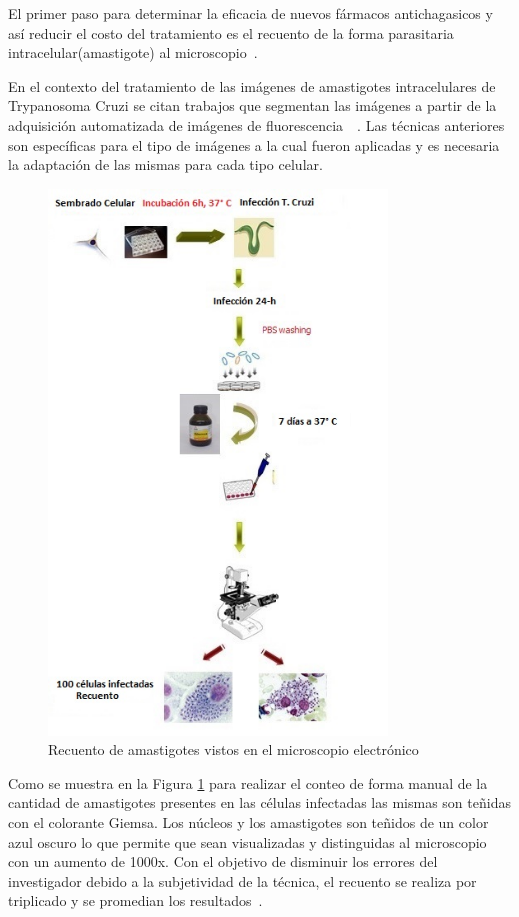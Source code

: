 El primer paso para determinar la eficacia de nuevos fármacos antichagasicos y así reducir el costo del tratamiento es el recuento de la forma parasitaria intracelular(amastigote) al microscopio~\cite{de2006analise}. 

En el contexto del tratamiento de las imágenes de amastigotes intracelulares de Trypanosoma Cruzi se citan trabajos que segmentan las imágenes a partir de la adquisición automatizada de imágenes de fluorescencia~\cite{engel2010image}~\cite{nohara2010high}. Las técnicas anteriores son específicas para el tipo de imágenes a la cual fueron aplicadas y es necesaria la adaptación de las mismas para cada tipo celular.

\begin{figure}[h!]
\centering
\includegraphics[width=90mm]{./figuras/amastigotes2.jpg}
\caption{Recuento de amastigotes vistos en el microscopio electrónico}
\label{img:imagen-amastigotes2}
\end{figure}

Como se muestra en la Figura \ref{img:imagen-amastigotes2} para realizar el conteo de forma manual de la cantidad de amastigotes presentes en las células infectadas las mismas son teñidas con el colorante Giemsa. Los núcleos y los amastigotes son teñidos de un color azul oscuro lo que permite que sean visualizadas y distinguidas al microscopio con un aumento de 1000x. Con el objetivo de disminuir los errores del investigador debido a la subjetividad de la técnica, el recuento se realiza por triplicado y se promedian los resultados~\cite{mendez1996leishmania}.

